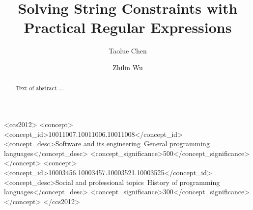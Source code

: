 \documentclass[sigplan,review,anonymous]{acmart}\settopmatter{printfolios=true,printccs=false,printacmref=false}
\begin{document}
\title{Solving String Constraints with Practical Regular Expressions}



\author{Taolue Chen}

\author{Zhilin Wu}


\begin{abstract}
Text of abstract \ldots.
\end{abstract}


\begin{CCSXML}
<ccs2012>
<concept>
<concept_id>10011007.10011006.10011008</concept_id>
<concept_desc>Software and its engineering~General programming languages</concept_desc>
<concept_significance>500</concept_significance>
</concept>
<concept>
<concept_id>10003456.10003457.10003521.10003525</concept_id>
<concept_desc>Social and professional topics~History of programming languages</concept_desc>
<concept_significance>300</concept_significance>
</concept>
</ccs2012>
\end{CCSXML}
\end{document}
